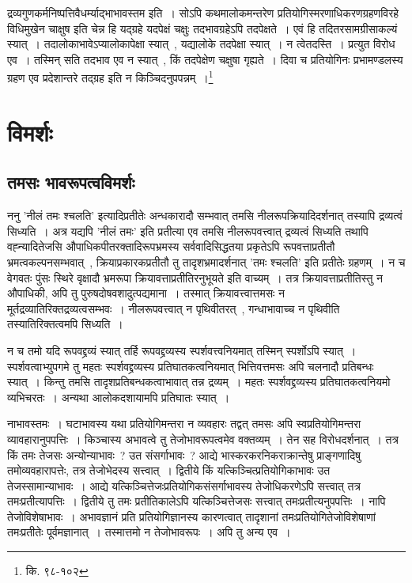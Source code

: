 		{\fontsize{11.7}{0}\selectfont\s द्रव्यगुणकर्मनिष्पत्तिवैधर्म्याद्भाभावस्तम इति~। सोऽपि कथमालोकमन्तरेण प्रतियोगिस्मरणाधिकरणग्रहणविरहे विधिमुखेन चाक्षुष इति चेन्न हि यद्ग्रहे यदपेक्षं चक्षुः तदभावग्रहेऽपि तदपेक्षते~। एवं हि तदितरसामग्रीसाकल्यं स्यात्~। तदालोकाभावेऽप्यालोकापेक्षा स्यात्~, यद्यालोके तदपेक्षा स्यात्~। न त्वेतदस्ति~। प्रत्युत विरोध एव~। तस्मिन् सति तदभाव एव न स्यात्~, किं तदपेक्षेण चक्षुषा गृह्यते~। दिवा च प्रतियोगिनः प्रभामण्डलस्य ग्रहण एव प्रदेशान्तरे तद्ग्रह इति न किञ्चिदनुपपन्नम्~।\footnote{कि. ९८-१०२}}

	\section{विमर्शः}

		\subsection{तमसः भावरूपत्वविमर्शः}

		ननु 'नीलं तमः श्चलति' इत्यादिप्रतीतेः अन्धकारादौ सम्भवात् तमसि नीलरूपक्रियादिदर्शनात् तस्यापि द्रव्यत्वं सिध्यति~। अत्र यद्यपि 'नीलं तमः' इति प्रतीत्या एव तमसि नीलरूपवत्त्वात् द्रव्यत्वं सिध्यति तथापि वह्न्यादितेजसि औपाधिकपीतरक्तादिरूपभ्रमस्य सर्ववादिसिद्धतया प्रकृतेऽपि रूपवत्ताप्रतीतौ भ्रमत्वकल्पनसम्भवात्~, क्रियाप्रकारकप्रतीतौ तु तादृशभ्रमादर्शनात् 'तमः श्चलति' इति प्रतीतेः ग्रहणम्~। न च वेगवतः पुंसः स्थिरे वृक्षादौ भ्रमरूपा क्रियावत्ताप्रतीतिरनुभूयते इति वाच्यम्~। तत्र क्रियावत्ताप्रतीतिस्तु न औपाधिकी, अपि तु पुरुषदोषवशादुत्पद्यमाना~। तस्मात् क्रियावत्त्वात्तमसः न मूर्तद्रव्यातिरिक्तद्रव्यत्वसम्भवः~। नीलरूपवत्त्वात् न पृथिवीतरत्~, गन्धाभावाच्च न पृथिवीति तस्यातिरिक्तत्वमपि सिध्यति~। 

		न च तमो यदि रूपवद्द्रव्यं स्यात् तर्हि रूपवद्द्रव्यस्य स्पर्शवत्त्वनियमात् तस्मिन् स्पर्शोऽपि स्यात्~। स्पर्शवत्वाभ्युपगमे तु महतः स्पर्शवद्द्रव्यस्य प्रतिघातकत्वनियमात् भित्तिवत्तमसः अपि चलनादौ प्रतिबन्धः स्यात्~। किन्तु तमसि तादृशप्रतिबन्धकत्वाभावात् तन्न द्रव्यम्~। महतः स्पर्शवद्द्रव्यस्य प्रतिघातकत्वनियमो व्यभिचरतः~। अन्यथा आलोकदशायामपि प्रतिघातः स्यात्~।

		नाभावस्तमः~। घटाभावस्य यथा प्रतियोगिमन्तरा न व्यवहारः तद्वत् तमसः अपि स्वप्रतियोगिमन्तरा व्यावहारानुपपत्तिः~।  किञ्चास्य अभावत्वे तु तेजोभावरूपत्वमेव वक्तव्यम्~। तेन सह विरोधदर्शनात्~। तत्र किं तमः तेजसः अन्योन्याभावः~? उत संसर्गाभावः~? आद्ये भास्करकरनिकराक्रान्तेषु प्राङ्गणादिषु तमोव्यवहारापत्तेः, तत्र तेजोभेदस्य सत्त्वात्~। द्वितीये किं यत्किञ्चित्प्रतियोगिकाभावः उत तेजस्सामान्याभावः~। आद्ये यत्किञ्चित्तेजःप्रतियोगिकसंसर्गाभावस्य तेजोधिकरणेऽपि सत्त्वात् तत्र तमःप्रतीत्यापत्तिः~। द्वितीये तु तमः प्रतीतिकालेऽपि यत्किञ्चित्तेजसः सत्त्वात् तमःप्रतीत्यनुपपत्तिः~। नापि तेजोविशेषाभावः~। अभावज्ञानं प्रति प्रतियोगिज्ञानस्य कारणत्वात् तादृशानां तमःप्रतियोगितेजोविशेषाणां तमःप्रतीतेः पूर्वमज्ञानात्~। तस्मात्तमो न तेजोभावरूपः~। अपि तु अन्य एव~। 

